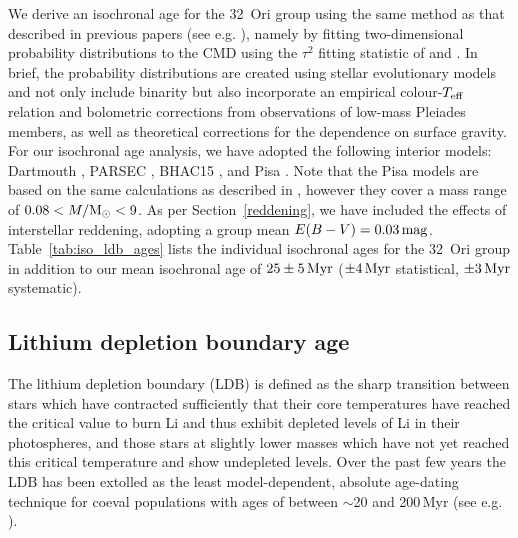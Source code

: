 \documentclass[usenatbib]{mnras}
\begin{document}
We derive an isochronal age for the 32~Ori group using the same method
as that described in previous papers (see
e.g. \citealp{Bell14,Bell15}), namely by fitting two-dimensional
probability distributions to the CMD using the $\tau^{2}$ fitting
statistic of \cite{Naylor06} and \cite{Naylor09}. In brief, the
probability distributions are created using stellar evolutionary
models and not only include binarity but also incorporate an empirical
colour-$T_{\rm{eff}}$ relation and bolometric corrections from
observations of low-mass Pleiades members, as well as theoretical
corrections for the dependence on surface gravity. For our isochronal
age analysis, we have adopted the following interior models: Dartmouth
\citep{Dotter08}, PARSEC \citep{Bressan12}, BHAC15 \citep{Baraffe15},
and Pisa \citep*{Tognelli15}.  Note that the Pisa models are based on
the same calculations as described in \cite{Tognelli15}, however they
cover a mass range of $0.08<M/\rm{M_{\odot}}<9$.  As per
Section~\ref{reddening}, we have included the effects of interstellar
reddening, adopting a group mean
$E(B-V)=0.03\,\rm{mag}$. Table~\ref{tab:iso_ldb_ages} lists the
individual isochronal ages for the 32~Ori group in addition to our
mean isochronal age of $25\pm5\,\rm{Myr}$ ($\pm4\,\rm{Myr}$
statistical, $\pm3\,\rm{Myr}$ systematic).

\subsection{Lithium depletion boundary age}
\label{ldb}

The lithium depletion boundary (LDB) is defined as the sharp
transition between stars which have contracted sufficiently that their
core temperatures have reached the critical value to burn Li and thus
exhibit depleted levels of Li in their photospheres, and those stars
at slightly lower masses which have not yet reached this critical
temperature and show undepleted levels. Over the past few years the
LDB has been extolled as the least model-dependent, absolute
age-dating technique for coeval populations with ages of between
$\sim$20 and 200\,Myr (see e.g. \citealp{Soderblom14}).
\end{document}
